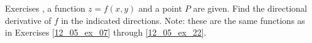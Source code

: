 {\noindent Exercises}
{, a function $z=f(x,y)$ and a point $P$ are given. Find the directional derivative of $f$ in the indicated directions. Note: these are the same functions as in Exercises \ref{12_05_ex_07} through \ref{12_05_ex_22}.
}
